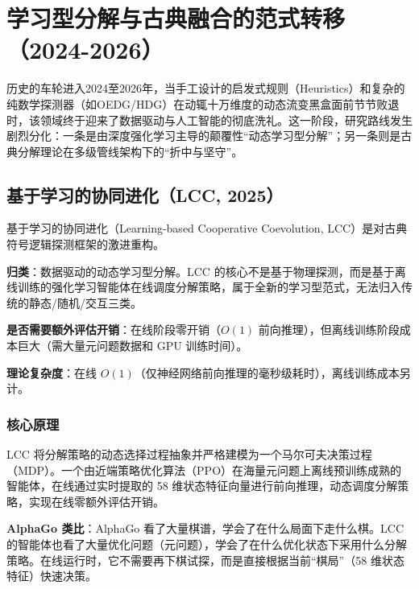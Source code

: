 \section{学习型分解与古典融合的范式转移（2024-2026）}
历史的车轮进入2024至2026年，当手工设计的启发式规则（Heuristics）和复杂的纯数学探测器（如OEDG/HDG）在动辄十万维度的动态流变黑盒面前节节败退时，该领域终于迎来了数据驱动与人工智能的彻底洗礼。这一阶段，研究路线发生剧烈分化：一条是由深度强化学习主导的颠覆性“动态学习型分解”；另一条则是古典分解理论在多级管线架构下的“折中与坚守”。

\subsection{基于学习的协同进化（LCC, 2025）}
基于学习的协同进化（Learning-based Cooperative Coevolution, LCC）是对古典符号逻辑探测框架的激进重构。

\textbf{归类}：数据驱动的动态学习型分解。LCC 的核心不是基于物理探测，而是基于离线训练的强化学习智能体在线调度分解策略，属于全新的学习型范式，无法归入传统的静态/随机/交互三类。

\textbf{是否需要额外评估开销}：在线阶段零开销（$O(1)$ 前向推理），但离线训练阶段成本巨大（需大量元问题数据和 GPU 训练时间）。

\textbf{理论复杂度}：在线 $O(1)$（仅神经网络前向推理的毫秒级耗时），离线训练成本另计。

\subsubsection*{核心原理}
LCC 将分解策略的动态选择过程抽象并严格建模为一个马尔可夫决策过程（MDP）。一个由近端策略优化算法（PPO）在海量元问题上离线预训练成熟的智能体，在线通过实时提取的 58 维状态特征向量进行前向推理，动态调度分解策略，实现在线零额外评估开销。

\textbf{AlphaGo 类比}：AlphaGo 看了大量棋谱，学会了在什么局面下走什么棋。LCC 的智能体也看了大量优化问题（元问题），学会了在什么优化状态下采用什么分解策略。在线运行时，它不需要再下棋试探，而是直接根据当前“棋局”（58 维状态特征）快速决策。

